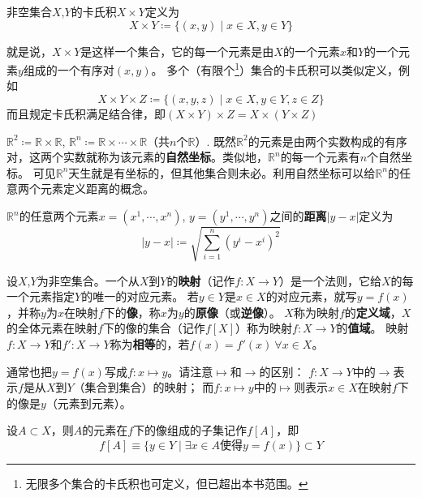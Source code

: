 \begin{definition}
	非空集合$X$,$Y$的卡氏积$X \times Y$定义为
	$$X \times Y \coloneq \{(x, y) \mid x \in X, y \in Y\}$$
\end{definition}

就是说，$X \times Y$是这样一个集合，它的每一个元素是由$X$的一个元素$x$和$Y$的一个元素$y$组成的一个有序对$(x, y)$。
多个（有限个\footnote{无限多个集合的卡氏积也可定义，但已超出本书范围。}）集合的卡氏积可以类似定义，例如
$$X \times Y \times Z \coloneq \{(x, y, z) \mid x \in X, y \in Y, z \in Z\}$$
而且规定卡氏积满足结合律，即$(X \times Y) \times Z = X \times (Y \times Z)$

\begin{example}
	$\mathbb{R}^2 \coloneq \mathbb{R} \times \mathbb{R}$, $\mathbb{R}^n \coloneq \mathbb{R} \times \cdots \times \mathbb{R}$（共$n$个$\mathbb{R}$）.
	既然$\mathbb{R}^2$的元素是由两个实数构成的有序对，这两个实数就称为该元素的\textbf{自然坐标}。类似地，$\mathbb{R}^n$的每一个元素有$n$个自然坐标。
	可见$\mathbb{R}^n$天生就是有坐标的，但其他集合则未必。利用自然坐标可以给$\mathbb{R}^n$的任意两个元素定义距离的概念。
\end{example}

\begin{definition}
	$\mathbb{R}^n$的任意两个元素$x = (x^1, \cdots, x^n)$, $y = (y^1, \cdots, y^n)$之间的\textbf{距离}$|y - x|$定义为
	$$|y - x| \coloneq \sqrt{\sum^n_{i = 1}(y^i - x^i)^2}$$
\end{definition}

\begin{definition}
	设$X$,$Y$为非空集合。一个从$X$到$Y$的\textbf{映射}（记作$f \colon X \to Y$）是一个法则，它给$X$的每一个元素指定$Y$的唯一的对应元素。
	若$y \in Y$是$x \in X$的对应元素，就写$y = f(x)$，并称$y$为$x$在映射$f$下的\textbf{像}，称$x$为$y$的\textbf{原像}（或\textbf{逆像}）。
	$X$称为映射$f$的\textbf{定义域}，$X$的全体元素在映射$f$下的像的集合（记作$f[X]$）称为映射$f \colon X \to Y$的\textbf{值域}。
	映射$f \colon X \to Y$和$f' \colon X \to Y$称为\textbf{相等}的，若$f(x) = f'(x) ~ \forall x \in X$。
\end{definition}

\begin{note}
	通常也把$y = f(x)$写成$f \colon x \mapsto y$。请注意$\mapsto$和$\to$的区别：
	$f \colon X \to Y$中的$\to$表示$f$是从$X$到$Y$（集合到集合）的映射；
	而$f \colon x \mapsto y$中的$\mapsto$则表示$x \in X$在映射$f$下的像是$y$（元素到元素）。
\end{note}

\begin{note}
	设$A \subset X$，则$A$的元素在$f$下的像组成的子集记作$f[A]$，即
	$$f[A] \equiv \{y \in Y \mid \exists x \in A \text{使得} y = f(x)\} \subset Y$$
\end{note}

